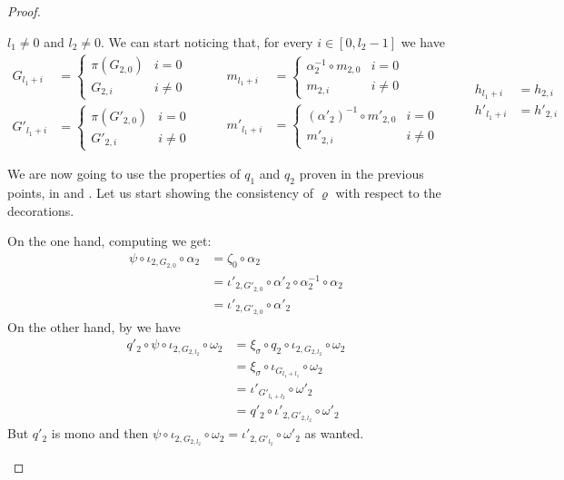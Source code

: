 \begin{proof}
\begin{enumerate}
		\smallskip \noindent $l_1\neq0$ and $l_2\neq 0$.  We can start noticing that, for every $i\in [0, l_2-1]$ we have
		\[\begin{split}G_{l_1+i}&=\begin{cases}
		\pi(G_{2, 0}) & i=0\\
		G_{2,i} &i\neq 0
		\end{cases} \\G'_{l_1+i}&=\begin{cases}
			\pi(G'_{2, 0}) & i=0\\
			G'_{2,i} &i\neq 0
			\end{cases} \end{split}\qquad 
	\begin{split} m_{l_1+i}&=\begin{cases}
		\alpha^{-1}_{2}\circ m_{2,0} & i=0\\
		m_{2,i} & i\neq 0
		\end{cases} \\m'_{l_1+i}&=\begin{cases}
		(\alpha'_2)^{-1}\circ m'_{2,0} & i=0\\
		m'_{2,i} & i\neq 0
		\end{cases}
	\end{split} \qquad 
	\begin{split}
h_{l_1+i}&=h_{2,i}\\h'_{l_1+i}&=h'_{2,i}
\end{split}\]

We are now going to use the properties of $q_1$ and $q_2$ proven in the previous points, in  and . Let us start showing the consistency of $\varrho$ with respect to the decorations.  

On the one hand, computing we get:
		\begin{align*}
\psi \circ \iota_{2, G_{2,0}}\circ \alpha_2&=  \zeta_0\circ \alpha_2\\&=  \iota'_{2, G'_{2,0}}\circ \alpha'_2\circ \alpha^{-1}_2\circ \alpha_2\\&=\iota'_{2, G'_{2,0}}\circ \alpha'_2
\end{align*}
	On the other hand, by we have
		\begin{align*}
			q'_2\circ \psi \circ \iota_{2, G_{2,l_2}}\circ \omega_2&=\xi_\sigma\circ q_2\circ \iota_{2, G_{2,l_2}}\circ \omega_2\\&=\xi_\sigma \circ \iota_{G_{l_1+l_1}} \circ \omega_2\\&=\iota'_{G'_{l_1+l_2}}\circ \omega'_2\\&=q'_2\circ \iota'_{2, G'_{2, l_2}}\circ \omega'_{2}
		\end{align*}
	But $q'_2$ is mono and then  $\psi \circ \iota_{2, G_{2,l_2}}\circ \omega_2=\iota'_{2, G'_{l_2}}\circ \omega'_{2}$ as wanted. 
		

\end{enumerate}
\end{proof}
